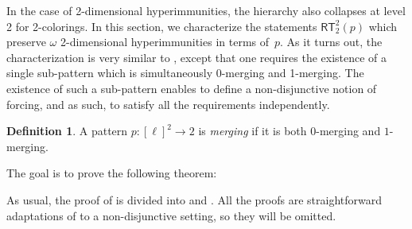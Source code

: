 \documentclass{article}
\newcommand{\RT}[0]{\mathsf{RT}}
\newcommand{\ludovic}[1]{\textcolor{blue}{#1}}
\newtheorem{theorem}{Theorem}
\numberwithin{theorem}{section}
\theoremstyle{definition}
\newtheorem{definition}[theorem]{Definition}
\begin{document}
In the case of 2-dimensional hyperimmunities, the hierarchy also collapses at level 2 for 2-colorings. In this section, we characterize the statements $\RT^2_2(p)$ which preserve $\omega$ 2-dimensional hyperimmunities in terms of~$p$. As it turns out, the characterization is very similar to , except that one requires the existence of a single sub-pattern which is simultaneously 0-merging and 1-merging. The existence of such a sub-pattern enables to define a non-disjunctive notion of forcing, and as such, to satisfy all the requirements independently.


\begin{definition}
A pattern $p : [\ell]^2 \to 2$ is \emph{merging} if it is both $0$-merging and $1$-merging.
\end{definition}

The goal is to prove the following theorem:


As usual, the proof of  is divided into  and . All the proofs are straightforward adaptations of  to a non-disjunctive setting, so they will be omitted.

\end{document}

